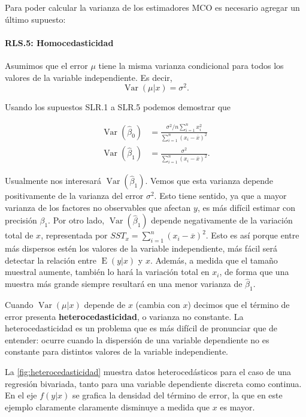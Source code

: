 \documentclass{report}\usepackage[]{graphicx}\usepackage[]{color}
\newcommand*{\kw}[1]{\textbf{#1}\index{#1}}
\newcommand{\Var}{\operatorname{Var}}
\newcommand{\E}{\operatorname{E}}
\begin{document}
Para poder calcular la varianza de los estimadores MCO es necesario agregar un último supuesto:

\paragraph{RLS.5: Homocedasticidad} 
Asumimos que el error $\mu$ tiene la misma varianza condicional para todos los valores de la variable independiente. Es decir,
\begin{equation}
\Var(\mu | x) = \sigma^2.
\end{equation}

Usando los supuestos SLR.1 a SLR.5 podemos demostrar que

\begin{align}
\Var(\hat\beta_0) &= \frac{\sigma^2/n \sum_{i=1}^n x_i^2}{\sum_{i=1}^n (x_i - \overline x)^2} \label{eq:var_hat_beta0} \\
\Var(\hat\beta_1) &= \frac{\sigma^2}{\sum_{i=1}^n (x_i - \overline x)^2}.\label{eq:var_hat_beta1}
\end{align}

Usualmente nos interesará $\Var(\hat\beta_1)$.
Vemos que esta varianza depende positivamente de la varianza del error $\sigma^2$. Esto tiene sentido, ya que a mayor varianza de los factores no observables que afectan $y$, es más difícil estimar con precisión $\beta_1$.
Por otro lado, $\Var(\hat\beta_1)$ depende negativamente de la variación total de $x$, representada por $SST_x = \sum_{i=1}^n (x_i - \overline x)^2$. Esto es así porque entre más dispersos estén los valores de la variable independiente, más fácil será detectar la relación entre $\E(y|x)$ y $x$.
Además, a medida que el tamaño muestral aumente, también lo hará la variación total en $x_i$, de forma que una muestra más grande siempre resultará en una menor varianza de $\hat\beta_1$.

Cuando $\Var(\mu | x)$ depende de $x$ (cambia con $x$) decimos que el término de error presenta \kw{heterocedasticidad}, o varianza no constante.
La heterocedasticidad es un problema que es más difícil de pronunciar que de entender: ocurre cuando la dispersión de una variable dependiente no es constante para distintos valores de la variable independiente.

La \autoref{fig:heterocedasticidad} muestra datos heterocedásticos para el caso de una regresión bivariada, tanto para una variable dependiente discreta como continua.
En el eje $f(y|x)$ se grafica la densidad del término de error, la que en este ejemplo claramente claramente disminuye a medida que $x$ es mayor.
\end{document}
